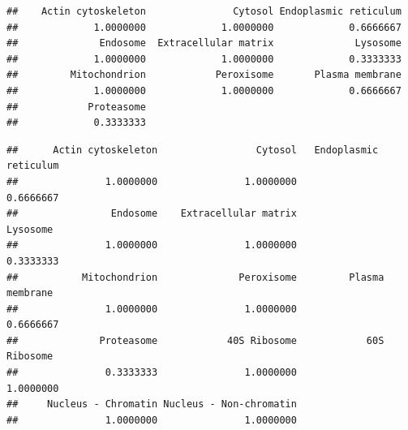 \begin{knitrout}
\color{fgcolor}\begin{kframe}
\begin{alltt}
 \hlkwb{<-} 
\end{alltt}
\begin{verbatim}
##    Actin cytoskeleton               Cytosol Endoplasmic reticulum 
##             1.0000000             1.0000000             0.6666667 
##              Endosome  Extracellular matrix              Lysosome 
##             1.0000000             1.0000000             0.3333333 
##         Mitochondrion            Peroxisome       Plasma membrane 
##             1.0000000             1.0000000             0.6666667 
##            Proteasome 
##             0.3333333
\end{verbatim}
\begin{alltt}
 \hlkwb{<-} \hlstd{(}\hlstd{,} \hlstd{)}
 \hlkwb{<-} \hlstd{(}\hlstd{,} \hlstd{,}
                         \hlstd{,}
                         \hlstd{)}
 \hlkwb{<-} 
\end{alltt}
\begin{verbatim}
##      Actin cytoskeleton                 Cytosol   Endoplasmic reticulum 
##               1.0000000               1.0000000               0.6666667 
##                Endosome    Extracellular matrix                Lysosome 
##               1.0000000               1.0000000               0.3333333 
##           Mitochondrion              Peroxisome         Plasma membrane 
##               1.0000000               1.0000000               0.6666667 
##              Proteasome            40S Ribosome            60S Ribosome 
##               0.3333333               1.0000000               1.0000000 
##     Nucleus - Chromatin Nucleus - Non-chromatin 
##               1.0000000               1.0000000
\end{verbatim}
\begin{alltt}
 \hlkwb{<-} \hlstd{bestpar[}\hlstd{(hl)]}

 \hlkwb{<-}   
                           \hlstd{=} \hlstd{(}\hlstd{,} \hlstd{))}
\end{alltt}
\end{kframe}
\end{knitrout}

